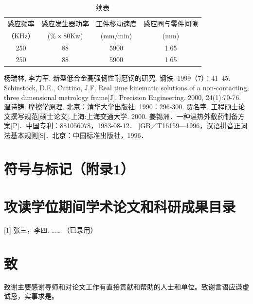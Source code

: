 \documentclass[UTF8,a4paper,12pt]{ctexart}
\numberwithin{equation}{section}
\begin{document}
\begin{table}
	\centering
	\captionsetup{singlelinecheck=off}
	\caption*{续表} %
	\begin{tabular}{|c| c|c|c|}
		\hline
		感应频率 &感应发生器功率 & 工件移动速度  &感应圈与零件间隙\\
		（KHz）&($\% \times$80Kw) &(mm/min)  &(mm)\\
		\hline
		250 &88 &5900 &1.65\\
		\hline
		250 &88 &5900 &1.65\\
		\hline
	\end{tabular}
\end{table}

\newpage
{}

\renewcommand\refname{参\quad考\quad文\quad献}
\begin{thebibliography}{1}
 杨瑞林, 李力军. 新型低合金高强韧性耐磨钢的研究. 钢铁. 1999（7）：41~45.
  Schinstock, D.E., Cuttino, J.F. Real time kinematic solutions of a non-contacting, three dimensional metrology frame[J]. Precision Engineering. 2000, 24(1):70-76. 
 温诗铸. 摩擦学原理. 北京：清华大学出版社. 1990：296-300.
 贾名字. 工程硕士论文撰写规范[硕士论文].上海:上海交通大学. 2000.
 姜锡洲．一种温热外敷药制备方案[P]．中国专利：881056078，1983-08-12．
]GB／T16159—1996，汉语拼音正词法基本规则[S]．北京：中国标准出版社，1996．
\end{thebibliography}

\newpage
{}

\section*{符号与标记（附录1）}

\newpage
{}

\section*{攻读学位期间学术论文和科研成果目录}

[1] 张三，李四. …… （已录用）

\newpage
{}

\section*{致}

\hspace{8mm}致谢主要感谢导师和对论文工作有直接贡献和帮助的人士和单位。致谢言语应谦虚诚恳，实事求是。
\end{document}
